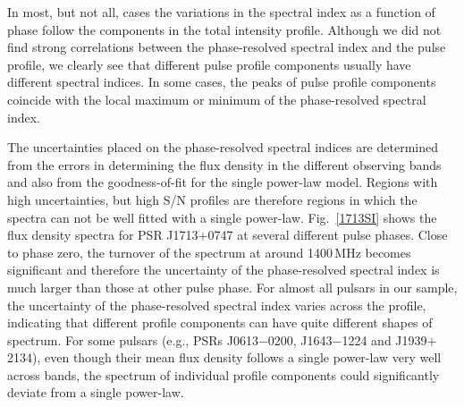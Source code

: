 \documentclass[useAMS,usenatbib]{mn2e}
\begin{document}
In most, but not all, cases the variations in the spectral index as a function of phase 
follow the components in the total intensity profile. 
Although we did not find strong correlations between the phase-resolved spectral 
index and the pulse profile, we clearly see that different pulse profile components usually 
have different spectral indices. In some cases, the peaks of pulse profile components 
coincide with the local maximum or minimum of the phase-resolved spectral index. 
%

%
The uncertainties placed on the phase-resolved spectral indices are determined from 
the errors in determining the flux density in the different observing bands and also 
from the goodness-of-fit for the single power-law model.  
%
Regions with high uncertainties, but high S/N profiles are therefore regions in 
which the spectra can not be well fitted with a single power-law. 
%
Fig.~\ref{1713SI} shows the flux density spectra for PSR J1713$+$0747 at several 
different pulse phases. Close to phase zero, the turnover of the spectrum at around 
1400\,MHz becomes significant and therefore the uncertainty of the phase-resolved 
spectral index is much larger than those at other pulse phase.
%
For almost all pulsars in our sample, the uncertainty of the phase-resolved spectral 
index varies across the profile, indicating that different profile components  
can have quite different shapes of spectrum. For some pulsars (e.g., PSRs J0613$-$0200, 
J1643$-$1224 and J1939$+$2134), even though their mean flux density follows a 
single power-law very well across bands, the spectrum of individual profile 
components could significantly deviate from a single power-law.
%

%
%
\end{document}
